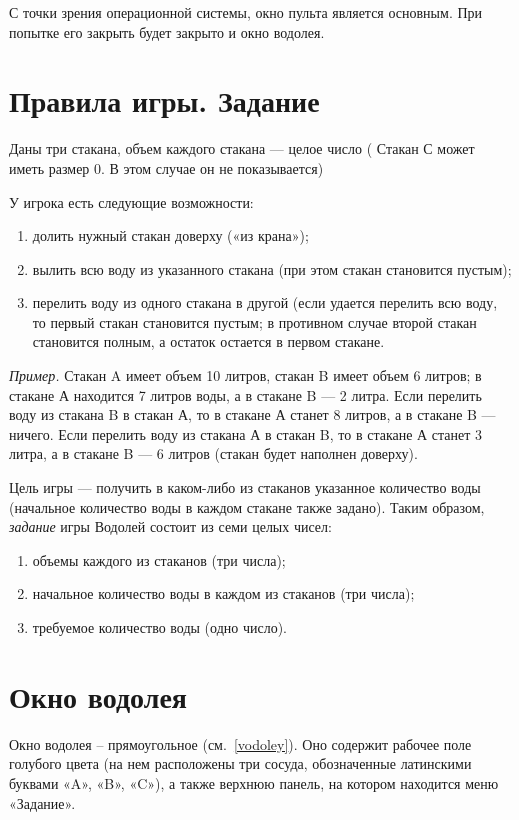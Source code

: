 С точки зрения операционной системы, окно пульта является основным. При попытке его закрыть будет закрыто и окно водолея.

\section{Правила игры. Задание}

Даны три стакана, объем каждого стакана --- целое число ( Стакан С может иметь размер 0. В этом случае он не показывается)

У игрока есть следующие возможности:
\begin{enumerate}
\item долить нужный стакан доверху («из крана»);
\item вылить всю воду из указанного стакана (при этом стакан становится пустым);
\item перелить воду из одного стакана в другой (если удается перелить всю воду, то первый стакан становится пустым; в противном случае второй стакан становится полным, а остаток остается в первом стакане.
\end{enumerate}

\emph{Пример.} Стакан A имеет объем 10 литров, стакан B имеет объем 6 литров; в стакане А находится 7 литров воды, а в стакане B --- 2 литра.  Если перелить воду из стакана B в стакан А, то в стакане А станет 8 литров, а в стакане B --- ничего.   Если перелить воду из стакана А в стакан B, то в стакане А станет 3 литра, а в стакане B --- 6 литров (стакан будет наполнен доверху).

Цель игры --- получить в каком-либо из стаканов указанное количество воды (начальное количество воды в каждом стакане также задано).	Таким образом, \emph{задание} игры Водолей состоит из семи целых чисел:
\begin{enumerate}
\item объемы каждого из стаканов (три числа);
\item начальное количество воды в каждом из стаканов (три числа);
\item требуемое количество воды (одно число).
\end{enumerate}

\section{Окно водолея}

Окно водолея – прямоугольное (см.~\ref{vodoley}). Оно содержит рабочее поле голубого цвета (на нем расположены три сосуда, обозначенные латинскими буквами «A», «B», «C»),  а также верхнюю панель, на котором находится меню «Задание».

